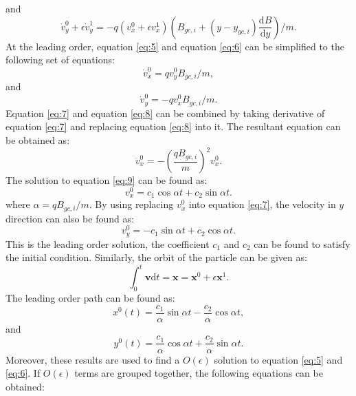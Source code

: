 \documentclass[11pt]{amsart}
\begin{document}
and 
\begin{equation}
\label{eq:6}
\dot{v}_{y}^{0}+\epsilon\dot{v}_{y}^{1}=-q (v_{x}^{0}+\epsilon v_{x}^{1})(B_{gc,i}+(y-y_{gc,i})\frac{\mathrm{d}B}{\mathrm{d}y})/m.
\end{equation}
At the leading order, equation \ref{eq:5} and equation \ref{eq:6} can be simplified to the following set of equations:
\begin{equation}
\label{eq:7}
\dot{v}_{x}^{0}=q v_{y}^{0} B_{gc,i}/m,
\end{equation}
and 
\begin{equation}
\label{eq:8}
\dot{v}_{y}^{0}=-q v_{x}^{0} B_{gc,i}/m.
\end{equation}
Equation \ref{eq:7} and equation \ref{eq:8} can be combined by taking derivative of equation \ref{eq:7} and replacing equation \ref{eq:8} into it. The resultant equation can be obtained as:
\begin{equation}
\label{eq:9}
\ddot{v}_{x}^{0}=-(\frac{q B_{gc,i}}{m})^2 v_{x}^{0}.
\end{equation}
The solution to equation \ref{eq:9} can be found as:
\begin{equation}
\label{eq:10}
v_{x}^{0}=c_1 \cos \alpha t +c_2 \sin \alpha t.
\end{equation}
where $\alpha=q B_{gc,i}/m$. By using replacing $v_{x}^0$ into equation \ref{eq:7}, the velocity in $y$ direction can also be found as:
\begin{equation}
\label{eq:11}
v_{y}^0=-c_1 \sin \alpha t +c_2 \cos \alpha t.
\end{equation}
This is the leading order solution, the coefficient $c_1$ and $c_2$ can be found to satisfy the initial condition. Similarly, the orbit of the particle can be given as:
\begin{equation}
\int_{0}^{t}\mathbf{v}\mathrm{d}t=\mathbf{x}=\mathbf{x}^{0}+\epsilon\mathbf{x}^1.
\end{equation}
The leading order path can be found as:
\begin{equation}
\label{eq:12}
x^{0}(t)=\frac{c_1}{\alpha}\sin \alpha t -\frac{c_2}{\alpha}\cos \alpha t,
\end{equation}
and 
\begin{equation}
\label{eq:13}
y^{0}(t)=\frac{c_1}{\alpha}\cos \alpha t +\frac{c_2}{\alpha}\sin \alpha t.
\end{equation}
Moreover, these results are used to find a $O(\epsilon)$ solution to equation \ref{eq:5} and \ref{eq:6}. If $O(\epsilon)$ terms are grouped together, the following equations can be obtained:
\end{document}
